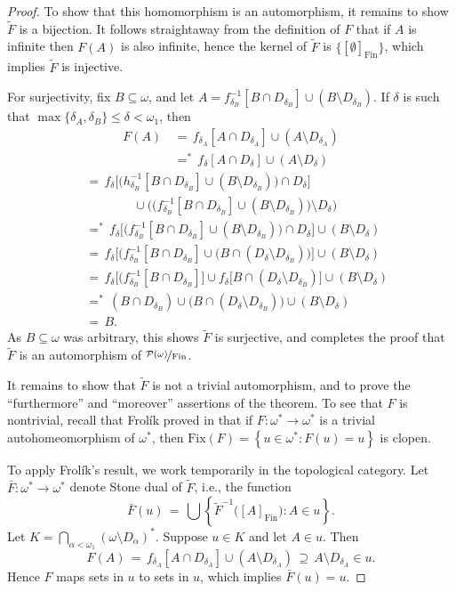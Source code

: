 \documentclass[11pt,leqno]{amsart}
\theoremstyle{definition}
\theoremstyle{remark}
\newcommand{\explicitSet}[1]{\left\lbrace #1 \right\rbrace}
\newcommand{\set}[2]{\explicitSet{#1 \colon #2}}
\newcommand{\<}{\langle}
\renewcommand{\>}{\rangle}
\renewcommand{\a}{\alpha}
\newcommand{\dlt}{\delta}
\newcommand{\w}{\omega}
\newcommand{\0}{\emptyset}
\newcommand{\sub}{\subseteq}
\newcommand{\1}{1\hspace{-1.75mm}1}
\newcommand{\pwmf}{\nicefrac{\mathcal{P}(\w)}{\mathrm{Fin}}}
\begin{document}
\begin{proof}
To show that this homomorphism is an automorphism, it remains to show $\tilde F$ is a bijection. 
It follows straightaway from the definition of $F$ that if $A$ is infinite then $F(A)$ is also infinite, hence the kernel of $\tilde F$ is $\{[\0]_\mathrm{Fin}\}$, which implies $\tilde F$ is injective. 

For surjectivity, fix $B \sub \w$, and let $A = f_{\dlt_B}^{-1}[B \cap D_{\dlt_B}] \cup (B \setminus D_{\dlt_B})$. If $\dlt$ is such that $\max\{\dlt_A,\dlt_B\} \leq \dlt < \w_1$, then 
\begin{align*}
F(A) &\,=\, f_{\dlt_A}[A \cap D_{\dlt_A}] \cup (A \setminus D_{\dlt_A}) \\
&\,=^*\, f_\dlt[A \cap D_\dlt] \cup (A \setminus D_\dlt) 
\end{align*}
\begin{align*}
&\,=\, f_\dlt \big[ \big( h_{\dlt_B}^{-1}[B \cap D_{\dlt_B}] \cup (B \setminus D_{\dlt_B}) \big) \cap D_\dlt \big] \\ 
&\qquad \qquad \cup \big( \big( f_{\dlt_B}^{-1}[B \cap D_{\dlt_B}] \cup ( B \setminus D_{\dlt_B} ) \big) \setminus D_\dlt \big) \\ 
&\,=^*\, f_\dlt \big[ \big( f_{\dlt_B}^{-1}[B \cap D_{\dlt_B}] \cup (B \setminus D_{\dlt_B}) \big) \cap D_\dlt \big] \cup ( B \setminus D_\dlt ) \\ 
&\,=\, f_\dlt \big[ \big( f_{\dlt_B}^{-1}[B \cap D_{\dlt_B}] \cup \big( B \cap (D_\dlt \setminus D_{\dlt_B}) \big) \big] \cup ( B \setminus D_\dlt ) \\ 
&\,=\, f_\dlt \big[ \big( f_{\dlt_B}^{-1}[B \cap D_{\dlt_B}] \big] \cup f_\dlt \big[ B \cap (D_\dlt \setminus D_{\dlt_B}) \big] \cup ( B \setminus D_\dlt ) \\ 
&\,=^*\, (B \cap D_{\dlt_B}) \cup \big( B \cap (D_\dlt \setminus D_{\dlt_B}) \big) \cup ( B \setminus D_\dlt ) \\ 
&\,=\, B.
\end{align*}
As $B \sub \w$ was arbitrary, this shows $\tilde F$ is surjective, and completes the proof that $\tilde F$ is an automorphism of $\pwmf$. 

It remains to show that $\tilde F$ is not a trivial automorphism, and to prove the ``furthermore'' and ``moreover'' assertions of the theorem. To see that $F$ is nontrivial, recall that Frol\'ik proved in \cite{Frolik} that 
if $F: \w^* \to \w^*$ is a trivial autohomeomorphism of $\w^*$, then $\mathrm{Fix}(F) = \set{u \in \w^*}{F(u)=u}$ is clopen. 

To apply Frol\'ik's result, we work temporarily in the topological category. Let $\bar F: \w^* \to \w^*$ denote Stone dual of $\tilde F$, i.e., the function 
$$\bar F(u) \,=\, \textstyle \bigcup \set{\tilde F^{-1}\big( [A]_\mathrm{Fin} \big)}{A \in u}.$$
Let $K = \bigcap_{\a < \w_1} ( \w \setminus D_\a )^*$. 
Suppose $u \in K$ and let $A \in u$. Then 
$$F(A) \,=\, f_{\dlt_A}[A \cap D_{\dlt_A}] \cup (A \setminus D_{\dlt_A}) \,\supseteq\, A \setminus D_{\dlt_A} \in u.$$
Hence $F$ maps sets in $u$ to sets in $u$, which implies $\bar F(u) = u$. 


\end{proof}
\end{document}
